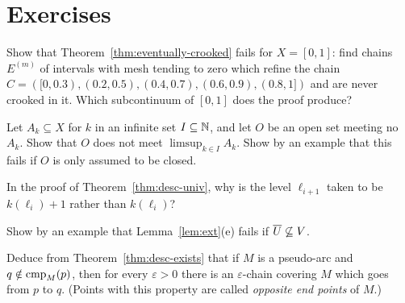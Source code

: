 \section*{Exercises}

\begin{exercise}
Show that Theorem~\ref{thm:eventually-crooked} fails for $X=[0,1]$: find chains $E^{(m)}$ of intervals with mesh tending to zero which
refine the chain $C=([0,0.3),(0.2,0.5),(0.4,0.7),(0.6,0.9),(0.8,1])$ and are never crooked in it. Which subcontinuum of $[0,1]$ does the proof
produce?
\end{exercise}

\begin{exercise}
Let $A_k\subseteq X$ for $k$ in an infinite set $I\subseteq\mathbb{N}$, and let $O$ be an open set meeting no $A_k$. Show that $O$ does not meet
$\limsup_{k\in I}A_k$. Show by an example that this fails if $O$ is only assumed to be closed.
\end{exercise}

\begin{exercise}
In the proof of Theorem~\ref{thm:desc-univ}, why is the level $\ell_{i+1}$ taken to be $k(\ell_i)+1$ rather than $k(\ell_i)$?
\end{exercise}

\begin{exercise}
Show by an example that Lemma~\ref{lem:ext}(e) fails if $\overline{U}\not\subseteq V$.
\end{exercise}

\begin{exercise}
Deduce from Theorem~\ref{thm:desc-exists} that if $M$ is a pseudo-arc and $q\notin\operatorname{cmp}_{M}(p)$, then for every $\varepsilon>0$ there is an
$\varepsilon$-chain covering $M$ which goes from $p$ to $q$. (Points with this property are called \emph{opposite end points} of $M$.)
\end{exercise}
